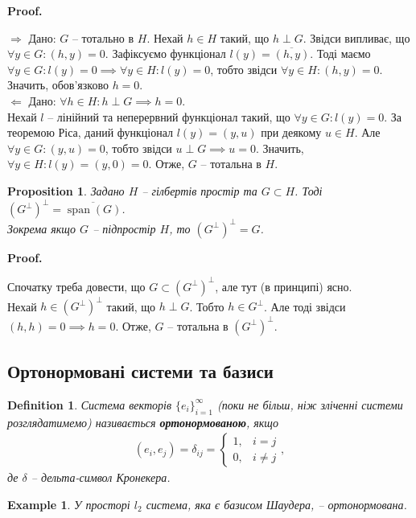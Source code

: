 \documentclass[a4paper, 10pt]{article}
\makeatletter
\def\rightproof{$\boxed{\Rightarrow}$ }
\def\leftproof{$\boxed{\Leftarrow}$ }
\theoremstyle{theoremdd}
\theoremstyle{theoremdd}
\newtheorem{definition}[theorem]{Definition}
\theoremstyle{theoremdd}
\theoremstyle{theoremdd}
\newtheorem{example}[theorem]{Example}
\theoremstyle{theoremdd}
\newtheorem{proposition}[theorem]{Proposition}
\theoremstyle{theoremdd}
\theoremstyle{theoremdd}
\theoremstyle{theoremdd}
\renewenvironment{proof}[1][Proof.\\]{\par
\pushQED{\hfill \qed}%
\normalfont \topsep6\p@\@plus6\p@\relax
\trivlist
\item\relax
{\bfseries
#1\@addpunct{.}}\hspace\labelsep\ignorespaces
}{%
\popQED\endtrivlist\@endpefalse
}
\DeclareMathOperator{\linspan}{span}
\makeatother
\begin{document}
\begin{proof}
\rightproof Дано: $G$ -- тотально в $H$. Нехай $h \in H$ такий, що $h \perp G$. Звідси випливає, що $\forall y \in G: (h,y) = 0$. Зафіксуємо функціонал $l(y) = \overline{(h,y)}$. Тоді маємо $\forall y \in G: l(y) = 0 \implies \forall y \in H: l(y) = 0$, тобто звідси $\forall y \in H: (h,y) = 0$. Значить, обов'язково $h = 0$.
\bigskip \\
\leftproof Дано: $\forall h \in H: h \perp G \implies h = 0$.\\
Нехай $l$ -- лінійний та неперервний функціонал такий, що $\forall y \in G: l(y) = 0$. За теоремою Ріса, даний функціонал $l(y) = (y,u)$ при деякому $u \in H$. Але $\forall y \in G: (y,u) = 0$, тобто звідси $u \perp G \implies u = 0$. Значить, $\forall y \in H: l(y) = (y,0) = 0$. Отже, $G$ -- тотальна в $H$.
\end{proof}

\begin{proposition}
Задано $H$ -- гілбертів простір та $G \subset H$. Тоді $(G^\perp)^\perp = \overline{\linspan(G)}$.\\
Зокрема якщо $G$ -- підпростір $H$, то $(G^\perp)^\perp = G$.
\end{proposition}

\begin{proof}
Спочатку треба довести, що $G \subset (G^\perp)^{\perp}$, але тут (в принципі) ясно.\\
Нехай $h \in (G^\perp)^\perp$ такий, що $h \perp G$. Тобто $h \in G^\perp$. Але тоді звідси $(h,h) = 0 \implies h = 0$. Отже, $G$ -- тотальна в $(G^\perp)^\perp$.
\end{proof}

\subsection{Ортонормовані системи та базиси}
\begin{definition}
Система векторів $\{e_i\}_{i=1}^\infty$ (поки не більш, ніж зліченні системи розглядатимемо) називається \textbf{ортонормованою}, якщо
\begin{align*}
(e_i,e_j) = \delta_{ij} = \begin{cases} 1,& i = j \\ 0, & i \neq j \end{cases},
\end{align*}
де $\delta$ -- дельта-символ Кронекера.
\end{definition}

\begin{example}
У просторі $l_2$ система, яка є базисом Шаудера, -- ортонормована.
\end{example}
\end{document}
